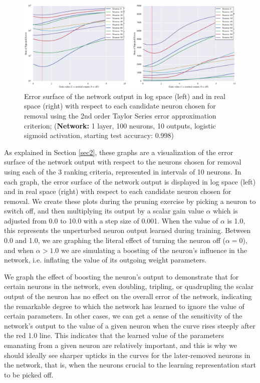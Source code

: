 \begin{figure}[!hb]
\centering
\includegraphics[width=\linewidth]{png/mnist-acc99-g2-gain.pdf}
\caption{Error surface of the network output in log space (left) and in real space (right) with respect to each candidate neuron chosen for removal using the 2nd order Taylor Series error approximation criterion; (\textbf{Network:} 1 layer, 100 neurons, 10 outputs, logistic sigmoid activation, starting test accuracy: 0.998)}
\label{fig:mnist-gt-single-layer}
\end{figure}

As explained in Section \ref{sec2}, these graphs are a visualization of the error surface of the network output with respect to the neurons chosen for removal using each of the 3 ranking criteria, represented in intervals of 10 neurons. In each graph, the error surface of the network output is displayed in log space (left) and in real space (right) with respect to each candidate neuron chosen for removal. We create these plots during the pruning exercise by picking a neuron to switch off, and then multiplying its output by a scalar gain value $\alpha$ which is adjusted from 0.0 to 10.0 with a step size of 0.001. When the value of $\alpha$ is 1.0, this represents the unperturbed neuron output learned during training. Between 0.0 and 1.0, we are graphing the literal effect of turning the neuron off ($\alpha = 0$), and when $\alpha > 1.0$ we are simulating a boosting of the neuron's influence in the network, i.e. inflating the value of its outgoing weight parameters. 

We graph the effect of boosting the neuron's output to demonstrate that for certain neurons in the network, even doubling, tripling, or quadrupling the scalar output of the neuron has no effect on the overall error of the network, indicating the remarkable degree to which the network has learned to ignore the value of certain parameters. In other cases, we can get a sense of the sensitivity of the network's output to the value of a given neuron when the curve rises steeply after the red 1.0 line. This indicates that the learned value of the parameters emanating from a given neuron are relatively important, and this is why we should ideally see sharper upticks in the curves for the later-removed neurons in the network, that is, when the neurons crucial to the learning representation start to be picked off. 

